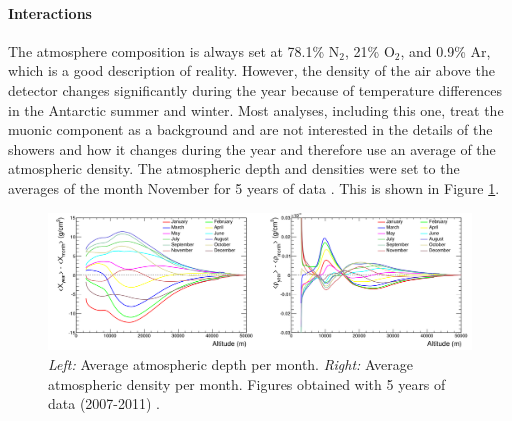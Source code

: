 \begin{table}[]
\centering
\caption{Best fit for parameters in Eq. \ref{eq:gaisser}. Numbers taken from Ref. \cite{Gaisser:2013bla}.}
\label{tab:fluxnormalization}
\end{table}

\paragraph{Interactions}
The atmosphere composition is always set at 78.1\% N$_2$, 21\% O$_2$, and 0.9\% Ar, which is a good description of reality. However, the density of the air above the detector changes significantly during the year because of temperature differences in the Antarctic summer and winter. Most analyses, including this one, treat the muonic component as a background and are not interested in the details of the showers and how it changes during the year and therefore use an average of the atmospheric density. The atmospheric depth and densities were set to the averages of the month November for 5 years of data \cite{samDeRidder}. This is shown in Figure \ref{fig:atmosphere}.\\

\begin{figure}
\centering
\includegraphics[width=\textwidth]{chapter6/img/atmosphere.png}
\caption{\textit{Left: }Average atmospheric depth per month. \textit{Right: }Average atmospheric density per month. Figures obtained with 5 years of data (2007-2011) \cite{samDeRidder}.}
\label{fig:atmosphere}
\end{figure}

